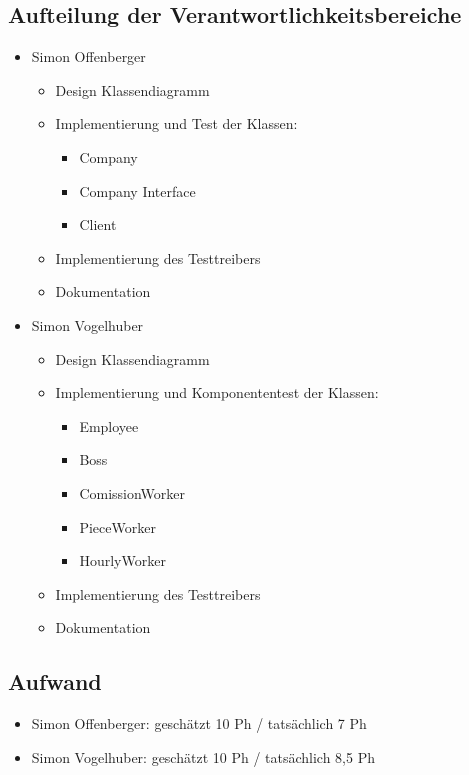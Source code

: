 \documentclass[12pt,naustrian,a4widepaper]{scrartcl}
\begin{document}
\subsection{Aufteilung der Verantwortlichkeitsbereiche}
\begin{itemize}
	\item Simon Offenberger
		\begin{itemize}
			\item Design Klassendiagramm
			\item Implementierung und Test der Klassen: 
			\begin{itemize}
				\item Company
				\item Company Interface
				\item Client
			\end{itemize}
			\item Implementierung des Testtreibers
			\item Dokumentation
		\end{itemize}
	\item Simon Vogelhuber
		\begin{itemize}
			\item Design Klassendiagramm
			\item Implementierung und Komponententest der Klassen: 
			\begin{itemize}
				\item Employee
				\item Boss
				\item ComissionWorker
				\item PieceWorker
				\item HourlyWorker
			\end{itemize}
			\item Implementierung des Testtreibers
			\item Dokumentation
		\end{itemize}	
\end{itemize}

\subsection{Aufwand}
	
	\begin{itemize}
		\item Simon Offenberger: geschätzt 10 Ph / tatsächlich 7 Ph
		\item Simon Vogelhuber:  geschätzt 10 Ph / tatsächlich 8,5 Ph
	\end{itemize}
\end{document}
